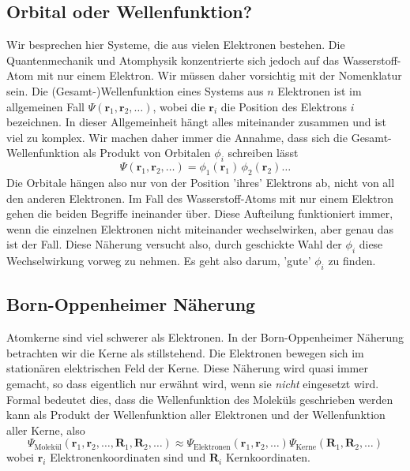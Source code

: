 \subsection{Orbital oder Wellenfunktion?}

Wir besprechen hier Systeme, die  aus vielen Elektronen bestehen. Die Quantenmechanik und Atomphysik konzentrierte sich jedoch auf das Wasserstoff-Atom mit nur einem Elektron. Wir müssen daher vorsichtig mit der Nomenklatur sein. Die (Gesamt-)Wellenfunktion eines Systems aus $n$ Elektronen ist im allgemeinen Fall $\Psi(\mathbf{r}_1, \mathbf{r}_2, \dots)$, wobei die $\mathbf{r}_i$ die Position des Elektrons $i$ bezeichnen. In dieser Allgemeinheit hängt alles miteinander zusammen und ist viel zu komplex. Wir machen daher immer die Annahme, dass sich die Gesamt-Wellenfunktion als Produkt von Orbitalen $\phi_i$ schreiben lässt
\begin{equation}
\Psi(\mathbf{r}_1, \mathbf{r}_2, \dots) = \phi_1(\mathbf{r}_1) \, \phi_2(\mathbf{r}_2)  \dots
\end{equation}
Die Orbitale hängen also nur von der Position 'ihres' Elektrons ab, nicht von all den anderen Elektronen. Im Fall des Wasserstoff-Atoms mit nur einem Elektron gehen die beiden Begriffe ineinander über.
Diese Aufteilung funktioniert immer, wenn die einzelnen Elektronen nicht miteinander wechselwirken, aber genau das ist der Fall. Diese Näherung versucht also, durch geschickte Wahl der $\phi_i$ diese Wechselwirkung vorweg zu nehmen. Es geht also darum, 'gute' $\phi_i$ zu finden.

\subsection{Born-Oppenheimer Näherung}

Atomkerne sind viel schwerer als Elektronen. In der Born-Oppenheimer Näherung betrachten wir die Kerne als stillstehend. Die Elektronen bewegen sich im stationären elektrischen Feld der Kerne. Diese Näherung wird quasi immer gemacht, so dass eigentlich nur erwähnt wird, wenn sie \emph{nicht} eingesetzt wird. Formal bedeutet dies, dass die Wellenfunktion des Moleküls geschrieben werden kann als Produkt der Wellenfunktion aller Elektronen und der Wellenfunktion aller Kerne, also
\begin{equation}
\Psi_{\text{Molekül}}(\mathbf{r}_1, \mathbf{r}_2, \dots, \mathbf{R}_1, \mathbf{R}_2, \dots)
  \approx
  \Psi_{\text{Elektronen}}(\mathbf{r}_1, \mathbf{r}_2, \dots )
\Psi_{\text{Kerne}}( \mathbf{R}_1, \mathbf{R}_2, \dots)
\end{equation}
wobei $\mathbf{r}_i$ Elektronenkoordinaten sind und $\mathbf{R}_i$ Kernkoordinaten.


